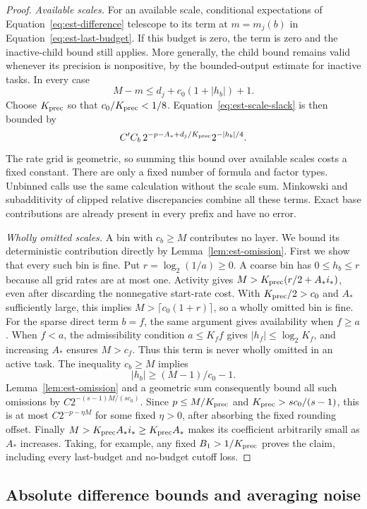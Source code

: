 \begin{proof}
\emph{Available scales.}  For an available scale, conditional expectations of
Equation~\eqref{eq:est-difference} telescope to its term at
$m=m_j(b)$ in Equation~\eqref{eq:est-last-budget}.  If this budget is
zero, the term is zero and the inactive-child bound still applies.
More generally, the child bound remains valid whenever its precision is
nonpositive, by the bounded-output estimate for inactive tasks.
In every case
\[
 M-m\le d_j+c_0(1+|h_b|)+1.
\]
Choose $K_{\rm prec}$ so that $c_0/K_{\rm prec}<1/8$.
Equation~\eqref{eq:est-scale-slack} is then bounded by
\[
 C' C_b\,2^{-p-A_*+d_j/K_{\rm prec}}2^{-|h_b|/4}.
\]
The rate grid is geometric, so summing this bound over available scales
costs a fixed constant.  There are only a fixed number of formula and
factor types.  Unbinned calls use the same calculation without the scale
sum.  Minkowski and subadditivity of clipped relative discrepancies
combine all these terms.  Exact base contributions are already present
in every prefix and have no error.

\emph{Wholly omitted scales.}  A bin with $c_b\ge M$ contributes no
layer.  We bound its deterministic contribution directly by
Lemma~\ref{lem:est-omission}.  First we show that every such bin is fine.
Put $r=\log_2(1/a)\ge0$.
A coarse bin has $0\le h_b\le r$ because all grid rates are at most one.
Activity gives
$M>K_{\rm prec}(r/2+A_*i_*)$, even after discarding the nonnegative
start-rate cost.  With $K_{\rm prec}/2>c_0$ and $A_*$ sufficiently large,
this implies $M>\lceil c_0(1+r)\rceil$, so a wholly omitted bin is fine.
For the sparse direct term $b=f$, the same argument gives availability
when $f\ge a$.  When $f<a$, the admissibility condition $a\le K_f f$
gives $|h_f|\le\log_2 K_f$, and increasing $A_*$ ensures $M>c_f$.
Thus this term is never wholly omitted in an active task.
The inequality $c_b\ge M$ implies
\[
 |h_b|\ge (M-1)/c_0-1.
\]
Lemma~\ref{lem:est-omission} and a geometric sum consequently bound all
such omissions by
$C2^{-(s-1)M/(s c_0)}$.  Since $p\le M/K_{\rm prec}$ and
$K_{\rm prec}>s c_0/(s-1)$, this is at most
$C2^{-p-\eta M}$ for some fixed $\eta>0$, after absorbing the fixed
rounding offset.  Finally $M>K_{\rm prec}A_*i_*\ge K_{\rm prec}A_*$
makes its coefficient arbitrarily small as $A_*$ increases.
Taking, for example, any fixed $B_1>1/K_{\rm prec}$ proves the claim,
including every last-budget and no-budget cutoff loss.
\end{proof}

\subsection{Absolute difference bounds and averaging noise}

